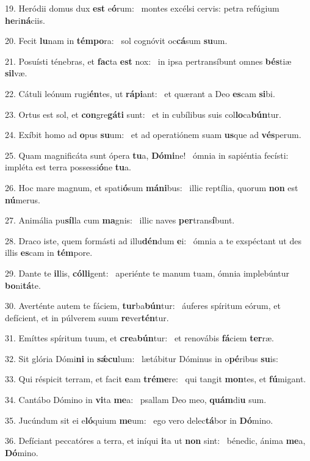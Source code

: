 19. Heródii domus dux \textbf{est} e\textbf{ó}rum: \ast\  montes excélsi cervis: petra refúgium \textbf{he}ri\textbf{ná}ciis.\

20. Fecit \textbf{lu}nam in \textbf{tém}\textbf{po}ra: \ast\  sol cognóvit oc\textbf{cá}sum \textbf{su}um.\

21. Posuísti ténebras, et \textbf{fac}ta \textbf{est} nox: \ast\  in ipsa pertransíbunt omnes \textbf{bés}tiæ \textbf{sil}væ.\

22. Cátuli leónum rugi\textbf{én}tes, ut \textbf{rá}\textbf{pi}ant: \ast\  et quærant a Deo \textbf{es}cam \textbf{si}bi.\

23. Ortus est sol, et \textbf{con}gre\textbf{gá}\textbf{ti} sunt: \ast\  et in cubílibus suis col\textbf{lo}ca\textbf{bún}tur.\

24. Exíbit homo ad \textbf{o}pus \textbf{su}um: \ast\  et ad operatiónem suam \textbf{us}que ad \textbf{vés}perum.\

25. Quam magnificáta sunt ópera \textbf{tu}a, \textbf{Dó}\textbf{mi}ne! \ast\  ómnia in sapiéntia fecísti: impléta est terra possessi\textbf{ó}ne \textbf{tu}a.\

26. Hoc mare magnum, et spati\textbf{ó}sum \textbf{má}\textbf{ni}bus: \ast\  illic reptília, quorum \textbf{non} est \textbf{nú}merus.\

27. Animália pu\textbf{síl}la cum \textbf{ma}gnis: \ast\  illic naves \textbf{per}trans\textbf{í}bunt.\

28. Draco iste, quem formásti ad illu\textbf{dén}dum \textbf{e}i: \ast\  ómnia a te exspéctant ut des illis \textbf{es}cam in \textbf{tém}pore.\

29. Dante te \textbf{il}lis, \textbf{cól}\textbf{li}gent: \ast\  aperiénte te manum tuam, ómnia implebúntur \textbf{bo}ni\textbf{tá}te.\

30. Averténte autem te fáciem, \textbf{tur}ba\textbf{bún}tur: \ast\  áuferes spíritum eórum, et defícient, et in púlverem suum \textbf{re}ver\textbf{tén}tur.\

31. Emíttes spíritum tuum, et \textbf{cre}a\textbf{bún}tur: \ast\  et renovábis \textbf{fá}ciem \textbf{ter}ræ.\

32. Sit glória Dómi\textbf{ni} in \textbf{sǽ}\textbf{cu}lum: \ast\  lætábitur Dóminus in o\textbf{pé}ribus \textbf{su}is:\

33. Qui réspicit terram, et facit \textbf{e}am \textbf{tré}\textbf{me}re: \ast\  qui tangit \textbf{mon}tes, et \textbf{fú}migant.\

34. Cantábo Dómino in \textbf{vi}ta \textbf{me}a: \ast\  psallam Deo meo, \textbf{quám}di\textbf{u} sum.\

35. Jucúndum sit ei e\textbf{ló}quium \textbf{me}um: \ast\  ego vero delec\textbf{tá}bor in \textbf{Dó}mino.\

36. Defíciant peccatóres a terra, et iníqui \textbf{i}ta ut \textbf{non} sint: \ast\  bénedic, ánima \textbf{me}a, \textbf{Dó}mino.\

